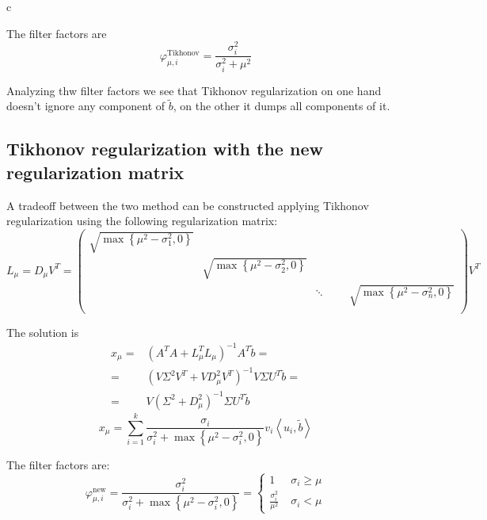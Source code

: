 c\documentclass[a4paper,10pt]{article}
\theoremstyle{plain}
\theoremstyle{definition}
\theoremstyle{remark}
\newcommand{\set}[1]{\left\{#1\right\}}
\newcommand{\pa}[1]{\left(#1\right)}
\newcommand{\ang}[1]{\left<#1\right>}
\begin{document}
The filter factors are
\begin{equation}
  \label{eq:tikfilter}
  \varphi ^{\text{Tikhonov}} _{\mu,i} = \frac{\sigma _i ^2}{\sigma _i
    ^2 + \mu ^2}
\end{equation}

Analyzing thw filter factors we see that Tikhonov regularization on
one hand doesn't ignore any component of $\tilde b$, on the other it
dumps all components of it.

\subsection{Tikhonov regularization with the new regularization matrix}

A tradeoff between the two method can be constructed applying Tikhonov
regularization using the following regularization matrix:
\begin{equation*}
  \label{eq:modtikL}
  L_\mu = D _\mu V^T =
  \begin{pmatrix}
    \sqrt{\max\set{\mu ^2 - \sigma _1 ^2,0}} \\
    & \sqrt{\max\set{\mu ^2 - \sigma _2 ^2,0}} \\
    & & \ddots
    & & & \sqrt{\max\set{\mu ^2 - \sigma _n ^2,0}} \\
  \end{pmatrix}
  V^T
\end{equation*}

The solution is
\begin{align*}
  x_\mu =& \pa{ A^T A + L_\mu^T L_\mu }^{-1} A^T \tilde b = \\
  = & \pa{ V \Sigma ^2 V^T + V D_\mu ^2 V^T} ^{-1} V\Sigma U^T \tilde
  b = \\
  = & V \pa{ \Sigma ^2 + D_\mu ^2 } ^{-1} \Sigma U^T \tilde b
\end{align*}
\begin{equation}
  \label{eq:modtikx}
  x_\mu  = \sum _{i=1} ^k \frac{\sigma _i}{\sigma _i ^2 + \max\set{
      \mu ^2 - \sigma _i ^2 ,0}  }  v_i \ang{u_i,\tilde b}
\end{equation}

The filter factors are:
\begin{equation}
  \label{eq:modtikfilter}
  \varphi ^{\text{new}} _{\mu,i} = \frac{\sigma _i ^2}{\sigma _i ^2 + \max\set{
      \mu ^2 - \sigma _i ^2 ,0}  } = \left\{
  \begin{matrix}
    1\; & \sigma _i \ge \mu \\
    \frac{\sigma _i ^2}{\mu ^2} \; & \sigma _i < \mu
  \end{matrix}
  \right.
\end{equation}
\end{document}
